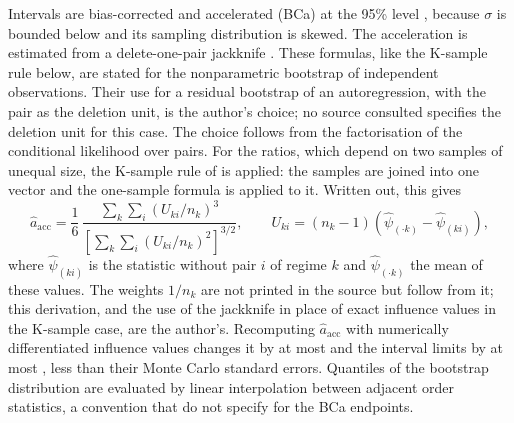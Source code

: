 \documentclass[11pt,a4paper]{article}
\begin{document}
Intervals are bias-corrected and accelerated (BCa) at the 95\% level \citep[eqs.~2.3, 2.8]{diciccio1996}, because $\sigma$ is bounded below and its sampling distribution is skewed. The acceleration is estimated from a delete-one-pair jackknife \citep[eqs.~6.6--6.7]{diciccio1996}. These formulas, like the K-sample rule below, are stated for the nonparametric bootstrap of independent observations. Their use for a residual bootstrap of an autoregression, with the pair as the deletion unit, is the author's choice; no source consulted specifies the deletion unit for this case. The choice follows from the factorisation of the conditional likelihood over pairs. For the ratios, which depend on two samples of unequal size, the K-sample rule of \citet[Remark~C, p.~15]{efron1994} is applied: the samples are joined into one vector and the one-sample formula is applied to it. Written out, this gives
\begin{equation}
\hat a_{\mathrm{acc}}=\frac{1}{6}\,\frac{\sum_k\sum_i \left(U_{ki}/n_k\right)^3}{\left[\sum_k\sum_i\left(U_{ki}/n_k\right)^2\right]^{3/2}},\qquad U_{ki}=(n_k-1)\left(\hat\psi_{(\cdot k)}-\hat\psi_{(ki)}\right),
\end{equation}
where $\hat\psi_{(ki)}$ is the statistic without pair $i$ of regime $k$ and $\hat\psi_{(\cdot k)}$ the mean of these values. The weights $1/n_k$ are not printed in the source but follow from it; this derivation, and the use of the jackknife in place of exact influence values in the K-sample case, are the author's. Recomputing $\hat a_{\mathrm{acc}}$ with numerically differentiated influence values changes it by at most \InflDacc{} and the interval limits by at most \InflDlim{}, less than their Monte Carlo standard errors. Quantiles of the bootstrap distribution are evaluated by linear interpolation between adjacent order statistics, a convention that \citet{diciccio1996} do not specify for the BCa endpoints.
\end{document}
